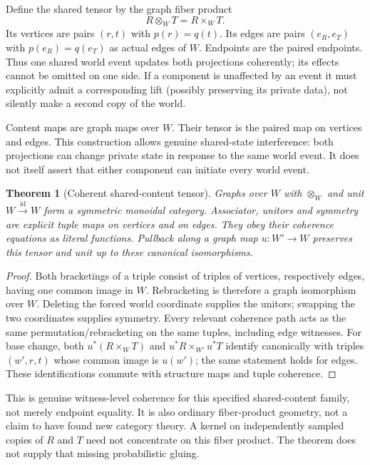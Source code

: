 \documentclass[11pt]{article}
\newtheorem{theorem}{Theorem}[section]
\begin{document}
Define the shared tensor by the graph fiber product
\[
 R\otimes_W T=R\times_W T.
\]
Its vertices are pairs $(r,t)$ with $p(r)=q(t)$. Its edges are pairs $(e_R,e_T)$ with $p(e_R)=q(e_T)$ as actual edges of $W$. Endpoints are the paired endpoints. Thus one shared world event updates both projections coherently; its effects cannot be omitted on one side. If a component is unaffected by an event it must explicitly admit a corresponding lift (possibly preserving its private data), not silently make a second copy of the world.

Content maps are graph maps over $W$. Their tensor is the paired map on vertices and edges. This construction allows genuine shared-state interference: both projections can change private state in response to the same world event. It does not itself assert that either component can initiate every world event.

\begin{theorem}[Coherent shared-content tensor]\label{content:shared}
Graphs over $W$ with $\otimes_W$ and unit $W\xrightarrow{\mathrm{id}}W$ form a symmetric monoidal category. Associator, unitors and symmetry are explicit tuple maps on vertices and on edges. They obey their coherence equations as literal functions. Pullback along a graph map $u:W'\to W$ preserves this tensor and unit up to these canonical isomorphisms.
\end{theorem}
\begin{proof}
Both bracketings of a triple consist of triples of vertices, respectively edges, having one common image in $W$. Rebracketing is therefore a graph isomorphism over $W$. Deleting the forced world coordinate supplies the unitors; swapping the two coordinates supplies symmetry. Every relevant coherence path acts as the same permutation/rebracketing on the same tuples, including edge witnesses. For base change, both $u^*(R\times_W T)$ and $u^*R\times_{W'}u^*T$ identify canonically with triples $(w',r,t)$ whose common image is $u(w')$; the same statement holds for edges. These identifications commute with structure maps and tuple coherence.
\end{proof}
This is genuine witness-level coherence for this specified shared-content family, not merely endpoint equality. It is also ordinary fiber-product geometry, not a claim to have found new category theory. A kernel on independently sampled copies of $R$ and $T$ need not concentrate on this fiber product. The theorem does not supply that missing probabilistic gluing.
\end{document}
